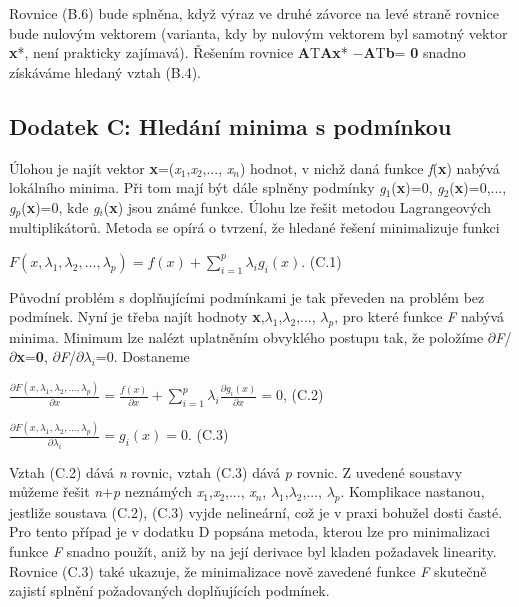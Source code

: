 \noindent Rovnice (B.6) bude splněna, když výraz ve druhé závorce na levé straně rovnice bude nulovým vektorem (varianta, kdy by nulovým vektorem byl samotný vektor \textbf{x}*, není prakticky zajímavá). Řešením rovnice \textbf{A}T\textbf{Ax}*\textbf{ }$-$\textbf{A}T\textbf{b}= \textbf{0} snadno získáváme hledaný vztah (B.4).

\noindent 
\subsection{Dodatek C:  Hledání minima s podmínkou}

\noindent Úlohou je najít vektor \textbf{x}=(\textit{x}${}_{1}$,\textit{x}${}_{2}$,..., \textit{x${}_{n}$}) hodnot, v nichž daná funkce \textit{f}(\textbf{x}) nabývá lokálního minima. Při tom mají být dále splněny podmínky \textit{g}${}_{1}$(\textbf{x})=0, \textit{g}${}_{2}$(\textbf{x})=0,..., \textit{g${}_{p}$}(\textbf{x})=0, kde \textit{g${}_{i}$}(\textbf{x}) jsou známé funkce. Úlohu lze řešit metodou Lagrangeových multiplikátorů. Metoda se opírá o tvrzení, že hledané řešení minimalizuje funkci

 $F\left(x,\lambda _{1} ,\lambda _{2} ,...,\lambda _{p} \right)=f\left(x\right)+\sum _{i=1}^{p}\lambda _{i} g_{i} \left(x\right) $. (C.1)

\noindent Původní problém s doplňujícími podmínkami je tak převeden na problém bez podmínek. Nyní je třeba najít hodnoty \textbf{x},$\lambda$${}_{1}$,$\lambda$${}_{2}$,..., $\lambda$\textit{${}_{p}$}, pro které funkce \textit{F} nabývá minima. Minimum lze nalézt uplatněním obvyklého postupu tak, že položíme $\partial$\textit{F}/$\partial$\textbf{x}=\textbf{0}, $\partial$\textit{F}/$\partial$$\lambda$\textit{${}_{i}$}=0. Dostaneme

 $\frac{\partial F\left(x,\lambda _{1} ,\lambda _{2} ,...,\lambda _{p} \right)}{\partial x} =\frac{f\left(x\right)}{\partial x} +\sum _{i=1}^{p}\lambda _{i} \frac{\partial g_{i} \left(x\right)}{\partial x}  =0$, (C.2)

 $\frac{\partial F\left(x,\lambda _{1} ,\lambda _{2} ,...,\lambda _{p} \right)}{\partial \lambda _{i} } =g_{i} \left(x\right)=0$. (C.3)

\noindent Vztah (C.2) dává \textit{n} rovnic, vztah (C.3) dává \textit{p} rovnic. Z uvedené soustavy můžeme řešit \textit{n}+\textit{p} neznámých \textit{x}${}_{1}$,\textit{x}${}_{2}$,..., \textit{x${}_{n}$}, $\lambda$${}_{1}$,$\lambda$${}_{2}$,..., $\lambda$\textit{${}_{p}$}. Komplikace nastanou, jestliže soustava (C.2), (C.3) vyjde nelineární, což je v praxi bohužel dosti časté. Pro tento případ je v dodatku D popsána metoda, kterou lze pro minimalizaci funkce \textit{F} snadno použít, aniž by na její derivace byl kladen požadavek linearity. Rovnice (C.3) také ukazuje, že minimalizace nově zavedené funkce \textit{F} skutečně zajistí splnění požadovaných doplňujících podmínek. 

